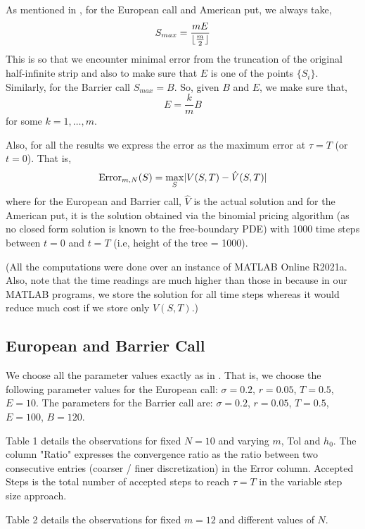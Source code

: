 \documentclass[a4paper,12pt]{article}
\begin{document}
As mentioned in \cite{col}, for the European call and American put, we always take,
\begin{equation}
    S_{max} = \frac{mE}{\lfloor \frac{m}{2} \rfloor}
\end{equation}
This is so that we encounter minimal error from the truncation of the original half-infinite strip and also to make sure that $E$ is one of the points $\{S_i\}$. 
Similarly, for the Barrier call $S_{max} = B$. So, given $B$ and $E$, we make sure that,
\begin{equation}
    E = \frac{k}{m}B
\end{equation}
for some $k = 1, \dots, m$. 

Also, for all the results we express the error as the maximum error at $\tau = T$ (or $t = 0$). That is,
\begin{equation}
    \operatorname{Error}_{m,N}(S) = \max_S \lvert V(S,T) - \hat{V}(S,T) \rvert
\end{equation}
where for the European and Barrier call, $\hat{V}$ is the actual solution and for the American put, it is the solution obtained via the binomial pricing algorithm (as no closed form solution is known to the free-boundary PDE) with 1000 time steps between $t = 0$ and $t = T$ (i.e, height of the tree = 1000).

(All the computations were done over an instance of MATLAB Online R2021a. Also, note that the time readings are much higher than those in \cite{col} because in our MATLAB programs, we store the solution for all time steps whereas it would reduce much cost if we store only $V(S, T)$.)

\subsection{European and Barrier Call}
We choose all the parameter values exactly as in \cite{col}. That is, we choose the following parameter values for the European call: $\sigma = 0.2$, $r = 0.05$, $T = 0.5$, $E = 10$. The parameters for the Barrier call are: $\sigma = 0.2$, $r = 0.05$, $T = 0.5$, $E = 100$, $B = 120$.

Table 1 details the observations for fixed $N = 10$ and varying $m$, Tol  and $h_0$. The column "Ratio" expresses the convergence ratio as the ratio between two consecutive entries (coarser / finer discretization) in the Error column. Accepted Steps is the total number of accepted steps to reach $\tau = T$ in the variable step size approach.

Table 2 details the observations for fixed $m = 12$ and different values of $N$. 
\end{document}

